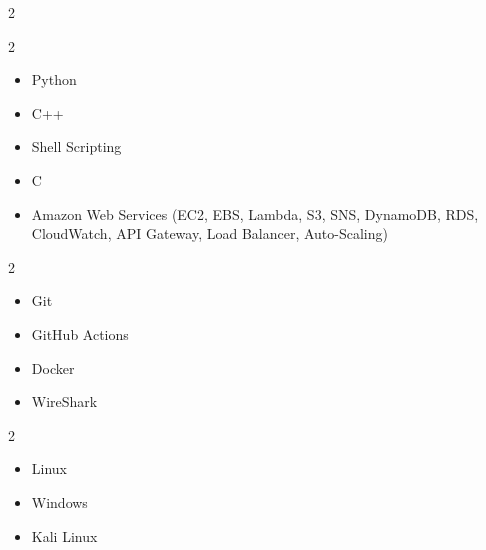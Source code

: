 \documentclass[10pt,a4paper,ragged2e]{maltacv}
\begin{document}
\smallskip
\begin{multicols}{2} %
  \begin{multicols}{2}
    \begin{itemize}
      \item Python
      \item C++
      \item Shell Scripting
      \item C
    \end{itemize}
  \end{multicols}
  \vspace{0.1cm}

  \vspace{-0.1cm}
  \begin{itemize}
    \item Amazon Web Services (EC2, EBS, Lambda, S3, SNS, DynamoDB, RDS, CloudWatch, API Gateway, Load Balancer, Auto-Scaling)
  \end{itemize}
  \vspace{0.2cm}
  
  \vspace{-0.2cm}
  \begin{multicols}{2}
     \begin{itemize}
      \item Git
      \item GitHub Actions
      \item Docker
      \item WireShark
    \end{itemize}
  \end{multicols}
  \vspace{0.3cm}
  
  \vspace{-0.1cm}
  \begin{multicols}{2}
    \begin{itemize}
      \item Linux
      \item Windows
      \item Kali Linux
    \end{itemize}
  \end{multicols}  
  
\end{multicols}



\divider
\medskip
\end{document}
